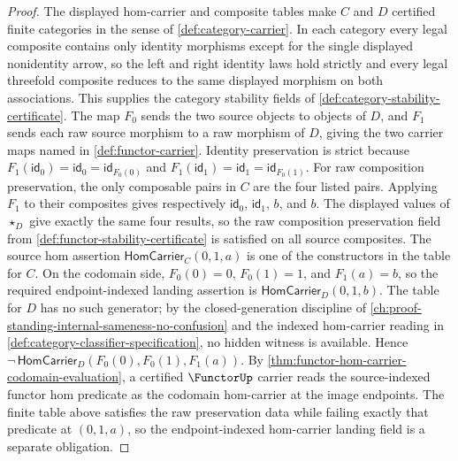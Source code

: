 \begin{proof}
The displayed hom-carrier and composite tables make $C$ and $D$ certified finite categories in the sense of \autoref{def:category-carrier}. In each category every legal composite contains only identity morphisms except for the single displayed nonidentity arrow, so the left and right identity laws hold strictly and every legal threefold composite reduces to the same displayed morphism on both associations. This supplies the category stability fields of \autoref{def:category-stability-certificate}.
The map $F_0$ sends the two source objects to objects of $D$, and $F_1$ sends each raw source morphism to a raw morphism of $D$, giving the two carrier maps named in \autoref{def:functor-carrier}. Identity preservation is strict because $F_1(\mathsf{id}_0)=\mathsf{id}_0=\mathsf{id}_{F_0(0)}$ and $F_1(\mathsf{id}_1)=\mathsf{id}_1=\mathsf{id}_{F_0(1)}$.
For raw composition preservation, the only composable pairs in $C$ are the four listed pairs. Applying $F_1$ to their composites gives respectively $\mathsf{id}_0$, $\mathsf{id}_1$, $b$, and $b$. The displayed values of $\star_D$ give exactly the same four results, so the raw composition preservation field from \autoref{def:functor-stability-certificate} is satisfied on all source composites.
The source hom assertion $\mathsf{HomCarrier}_{C}(0,1,a)$ is one of the constructors in the table for $C$. On the codomain side, $F_0(0)=0$, $F_0(1)=1$, and $F_1(a)=b$, so the required endpoint-indexed landing assertion is $\mathsf{HomCarrier}_{D}(0,1,b)$. The table for $D$ has no such generator; by the closed-generation discipline of \autoref{ch:proof-standing-internal-sameness-no-confusion} and the indexed hom-carrier reading in \autoref{def:category-classifier-specification}, no hidden witness is available. Hence $\neg\,\mathsf{HomCarrier}_{D}(F_0(0),F_0(1),F_1(a))$.
By \autoref{thm:functor-hom-carrier-codomain-evaluation}, a certified $\FunctorUp$ carrier reads the source-indexed functor hom predicate as the codomain hom-carrier at the image endpoints. The finite table above satisfies the raw preservation data while failing exactly that predicate at $(0,1,a)$, so the endpoint-indexed hom-carrier landing field is a separate obligation.
\end{proof}


